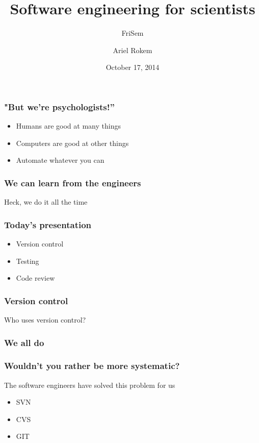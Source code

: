 \documentclass{beamer}
\title[Software engineering for scientists]{Software engineering for scientists}
\subtitle{FriSem}
\author[Ariel Rokem] %
{Ariel Rokem}
\date{October 17, 2014}
\institute[Stanford University]
{Stanford University}
\begin{document}
\begin{frame}
  \titlepage
  \hfill

\end{frame}


\begin{frame}
\frametitle{"But we're psychologists!''}
\begin{itemize}
\pause
\item
Humans are good at many things
\pause
\item 
Computers are good at other things
\pause
\item
Automate whatever you can
\end{itemize}
\end{frame}

\begin{frame}
\frametitle{We can learn from the engineers}
\pause
 Heck, we do it all the time
\end{frame}

\begin{frame}
\frametitle{Today's presentation}
\begin{itemize}
\pause
\item
Version control
\item
Testing
\item
Code review 
\end{itemize}
\end{frame}

\begin{frame}
\frametitle{Version control}
Who uses version control?
\end{frame}

\begin{frame}
\frametitle{We all do}
\end{frame}

\begin{frame}
\frametitle{Wouldn't you rather be more systematic?}
The software engineers have solved this problem for us
\begin{itemize}
\pause
\item
SVN
\pause
\item
CVS 
\pause
\item
GIT
\end{itemize}
\end{frame}
\end{document}
